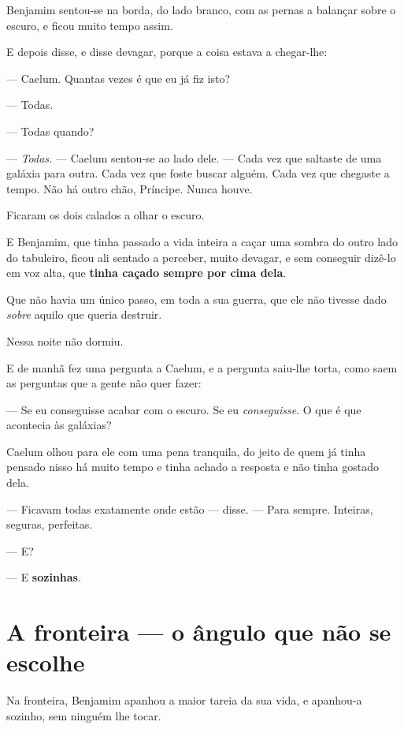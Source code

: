 \documentclass[livro.tex]{subfiles}
\begin{document}
\medskip

Benjamim sentou-se na borda, do lado branco, com as pernas a balançar sobre o escuro, e ficou muito tempo assim.

E depois disse, e disse devagar, porque a coisa estava a chegar-lhe:

--- Caelum. Quantas vezes é que eu já fiz isto?

--- Todas.

--- Todas quando?

--- \emph{Todas.} --- Caelum sentou-se ao lado dele. --- Cada vez que saltaste de uma galáxia para outra. Cada vez
que foste buscar alguém. Cada vez que chegaste a tempo. Não há outro chão, Príncipe. Nunca houve.

\medskip

Ficaram os dois calados a olhar o escuro.

E Benjamim, que tinha passado a vida inteira a caçar uma sombra do outro lado do tabuleiro, ficou ali sentado a
perceber, muito devagar, e sem conseguir dizê-lo em voz alta, que \textbf{tinha caçado sempre por cima dela}.

Que não havia um único passo, em toda a sua guerra, que ele não tivesse dado \emph{sobre} aquilo que queria
destruir.

\medskip

Nessa noite não dormiu.

E de manhã fez uma pergunta a Caelum, e a pergunta saiu-lhe torta, como saem as perguntas que a gente não quer
fazer:

--- Se eu conseguisse acabar com o escuro. Se eu \emph{conseguisse}. O que é que acontecia às galáxias?

Caelum olhou para ele com uma pena tranquila, do jeito de quem já tinha pensado nisso há muito tempo e tinha
achado a resposta e não tinha gostado dela.

--- Ficavam todas exatamente onde estão --- disse. --- Para sempre. Inteiras, seguras, perfeitas.

--- E?

--- E \textbf{sozinhas}.


\chapter{A fronteira --- o ângulo que não se escolhe}

Na fronteira, Benjamim apanhou a maior tareia da sua vida, e apanhou-a sozinho, sem ninguém lhe tocar.

\medskip
\end{document}
